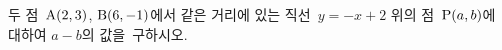 두 점~$\mathrm{A}(2{,}\mkern3mu\mathopen{}3)$, $\mathrm{B}(6{,}\mkern3mu\mathopen{}-1)$에서 같은 거리에 있는 \mbox{직선~$y=-x+2$} 위의 점~$\mathrm{P}(a{,}\mkern3mu\mathopen{}b)$에 대하여 $a-b$의 \mbox{값을 구하시오.}
